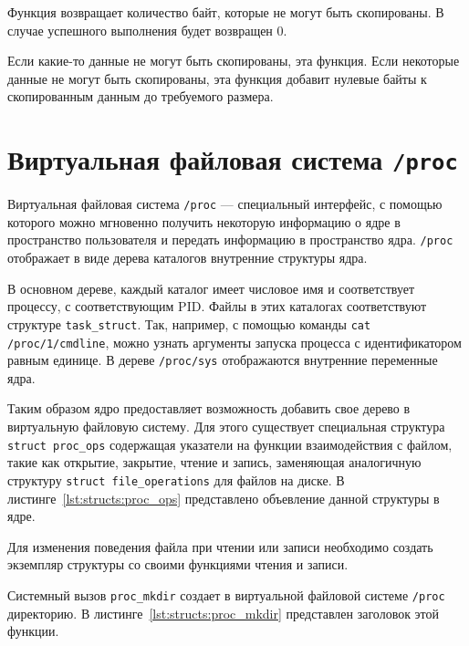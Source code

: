 Функция возвращает количество байт, которые не могут быть скопированы. 
В случае успешного выполнения будет возвращен 0.

Если какие-то данные не могут быть скопированы, эта функция.
Если некоторые данные не могут быть скопированы, эта функция добавит нулевые байты к скопированным данным до требуемого размера.

\section{Виртуальная файловая система \texttt{/proc}}

Виртуальная файловая система \texttt{/proc} --- специальный интерфейс, с помощью которого можно мгновенно получить некоторую информацию о ядре в пространство пользователя и передать информацию в пространство ядра.
\texttt{/proc} отображает в виде дерева каталогов внутренние структуры ядра.

В основном дереве, каждый каталог имеет числовое имя и соответствует процессу, с соответствующим PID. Файлы в этих каталогах соответствуют структуре \texttt{task\_struct}.
Так, например, с помощью команды \texttt{cat /proc/1/cmdline}, можно узнать аргументы запуска процесса с идентификатором равным единице. В дереве \texttt{/proc/sys} отображаются внутренние переменные ядра.

Таким образом ядро предоставляет возможность добавить свое дерево в виртуальную файловую систему. 
Для этого существует специальная структура \texttt{struct proc\_ops} содержащая указатели на функции взаимодействия с файлом, такие как открытие, закрытие, чтение и запись, заменяющая аналогичную структуру
\texttt{struct file\_operations} для файлов на диске. 
В листинге~\ref{lst:structs:proc_ops} представлено объевление данной структуры в ядре.

\clearpage



Для изменения поведения файла при чтении или записи необходимо создать экземпляр структуры со своими функциями чтения и записи.

Системный вызов \texttt{proc\_mkdir} создает в виртуальной файловой системе \texttt{/proc} директорию. В листинге~\ref{lst:structs:proc_mkdir} представлен заголовок этой функции.

\clearpage



